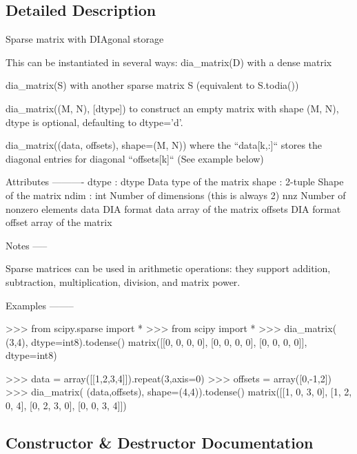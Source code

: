 \subsection{Detailed Description}
\begin{DoxyVerb}Sparse matrix with DIAgonal storage

This can be instantiated in several ways:
    dia_matrix(D)
        with a dense matrix

    dia_matrix(S)
        with another sparse matrix S (equivalent to S.todia())

    dia_matrix((M, N), [dtype])
        to construct an empty matrix with shape (M, N),
        dtype is optional, defaulting to dtype='d'.

    dia_matrix((data, offsets), shape=(M, N))
        where the ``data[k,:]`` stores the diagonal entries for
        diagonal ``offsets[k]`` (See example below)

Attributes
----------
dtype : dtype
    Data type of the matrix
shape : 2-tuple
    Shape of the matrix
ndim : int
    Number of dimensions (this is always 2)
nnz
    Number of nonzero elements
data
    DIA format data array of the matrix
offsets
    DIA format offset array of the matrix

Notes
-----

Sparse matrices can be used in arithmetic operations: they support
addition, subtraction, multiplication, division, and matrix power.

Examples
--------

>>> from scipy.sparse import *
>>> from scipy import *
>>> dia_matrix( (3,4), dtype=int8).todense()
matrix([[0, 0, 0, 0],
        [0, 0, 0, 0],
        [0, 0, 0, 0]], dtype=int8)

>>> data = array([[1,2,3,4]]).repeat(3,axis=0)
>>> offsets = array([0,-1,2])
>>> dia_matrix( (data,offsets), shape=(4,4)).todense()
matrix([[1, 0, 3, 0],
        [1, 2, 0, 4],
        [0, 2, 3, 0],
        [0, 0, 3, 4]])\end{DoxyVerb}
 

\subsection{Constructor \& Destructor Documentation}
\hypertarget{classscipy_1_1sparse_1_1dia_1_1dia__matrix_a2fe326fc8bd85401679265eb23e75c6a}{}
